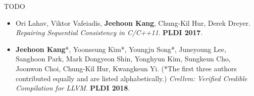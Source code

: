 TODO

\begin{itemize}
\item[\cite{scfix}] Ori Lahav, Viktor Vafeiadis, \textbf{Jeehoon Kang}, Chung-Kil Hur, Derek Dreyer.
  \emph{Repairing Sequential Consistency in C/C++11}.  \textbf{PLDI 2017}.
\item[\cite{crellvm}] \textbf{Jeehoon Kang}*, Yoonseung Kim*, Youngju Song*, Juneyoung Lee, Sanghoon
  Park, Mark Dongyeon Shin, Yonghyun Kim, Sungkeun Cho, Joonwon Choi, Chung-Kil Hur, Kwangkeun Yi.
  (*The first three authors contributed equally and are listed alphabetically.)  \emph{Crellvm:
    Verified Credible Compilation for LLVM}.  \textbf{PLDI 2018}.
\end{itemize}


